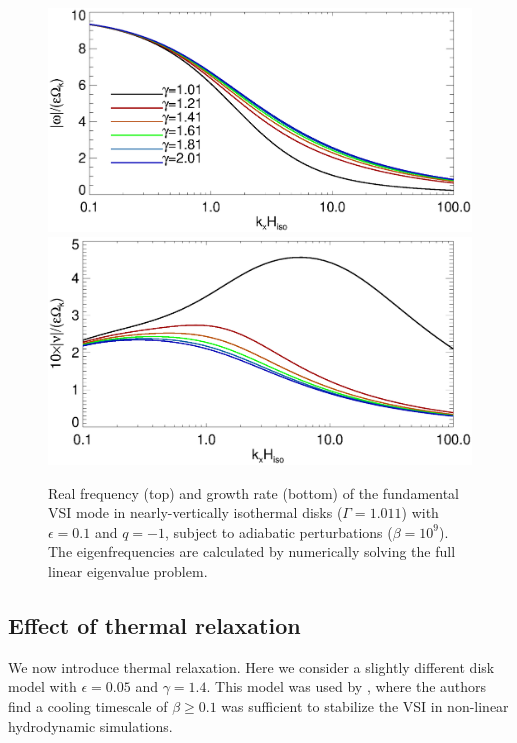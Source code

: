 \begin{figure}
  \includegraphics[width=\linewidth,clip=true,trim=0cm 1.75cm 0cm 0cm]{figures/compare_eigen_real1}
  \includegraphics[width=\linewidth,clip=true,trim=0cm 0cm 0cm 1cm]{figures/compare_eigen_imag1}
  \caption{Real frequency (top) and growth rate 
    (bottom) of the fundamental VSI mode in nearly-vertically   
    isothermal disks ($\Gamma=1.011$) with $\epsilon=0.1$ and  
    $q=-1$, subject to adiabatic perturbations
    ($\beta=10^9$). The eigenfrequencies are calculated by numerically
    solving the full linear eigenvalue problem. \label{adia_growth_num}}   
\end{figure}   

\subsection{Effect of thermal relaxation}
We now introduce thermal relaxation. Here we consider a slightly
different disk model with $\epsilon=0.05$ and
$\gamma=1.4$. This model was used by \citep{nelson13}, where the
authors find a cooling timescale of $\beta\geq 0.1$ was sufficient to
stabilize the VSI in non-linear hydrodynamic simulations. 









